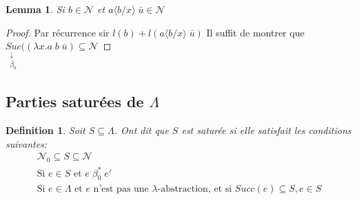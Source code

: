 \documentclass{article}
\newtheorem{lemma}{Lemma}
\newtheorem{defi}{Definition}
\newcommand\subst[2]{\langle #1\big/#2\rangle}
\newcommand\lterm[2]{\lambda #1. #2}
\newcommand\tlambda[0]{$\lambda$}
\begin{document}
\begin{lemma}
Si $b\in \mathcal{N}$ et $a\subst{b}{x}\; \bar{u} \in \mathcal{N}$
\end{lemma}
\begin{proof}
Par récurrence sir $l(b) + l(a\subst{b}{x}\; \bar{u})$
Il suffit de montrer que $\underset{\substack{\downarrow\\ \beta_0}}{Suc}((\lterm{x}{a}\; b\; \bar{u}) \subseteq \mathcal{N}$
\end{proof}

\subsection{Parties saturées de $\Lambda$}
\begin{defi}
Soit $S\subseteq \Lambda$. Ont dit que $S$ est \emph{saturée} si elle satisfait les conditions suivantes:
\begin{align*}
\mathcal{N}_0 \subseteq S \subseteq \mathcal{N} \tag{Sat 1}\\
\text{Si } e\in S \text{ et } e\;\beta_0^*\;e'\tag{Sat 2}\\
\text{Si $e\in \Lambda$ et $e$ n'est pas une \tlambda-abstraction, et si } Succ(e)\subseteq S, e\in S\tag{Sat 3}
\end{align*}

\end{defi}
\end{document}

